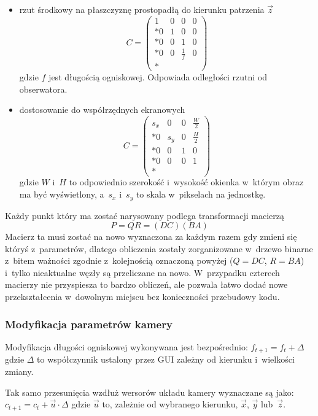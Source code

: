 \documentclass[12pt,a4paper]{article}
\begin{document}
\begin{itemize}
  \item rzut środkowy na płaszczyznę prostopadłą do kierunku patrzenia $\overset{\rightarrow}{z}$
      \[ C = \left( \begin{array}{cccc}
        1 & 0 & 0 & 0 \\*
        0 & 1 & 0 & 0 \\*
        0 & 0 & 1 & 0 \\*
        0 & 0 & \frac{1}{f} & 0 \\*
      \end{array} \right)
      \]
      gdzie $f$ jest długością ogniskowej. Odpowiada odległości rzutni od obserwatora.

  \item dostosowanie do współrzędnych ekranowych
    \[ C = \left( \begin{array}{cccc}
      s_x & 0 & 0 & \frac{W}{2} \\*
      0 & s_y & 0 & \frac{H}{2} \\*
      0 & 0 & 1 & 0 \\*
      0 & 0 & 0 & 1 \\*
    \end{array} \right) \]
    gdzie $W$ i~$H$ to odpowiednio szerokość i~wysokość okienka w~którym obraz ma być wyświetlony,
    a~$s_x$ i~$s_y$ to skala w~pikselach na jednostkę.
\end{itemize}

Każdy punkt który ma zostać narysowany podlega transformacji macierzą
\[ P = QR = (DC)(BA) \]
Macierz ta musi zostać na nowo wyznaczona za każdym razem gdy zmieni się któryś z~parametrów,
dlatego obliczenia zostały zorganizowane w~drzewo binarne z~bitem ważności
zgodnie z~kolejnością oznaczoną powyżej ($Q=DC$, $R=BA$) i~tylko nieaktualne węzły
są przeliczane na nowo.
W~przypadku czterech macierzy nie przyspiesza to bardzo obliczeń,
ale pozwala łatwo dodać nowe przekształcenia w~dowolnym miejscu bez konieczności
przebudowy kodu.

\subsubsection{Modyfikacja parametrów kamery}

Modyfikacja długości ogniskowej wykonywana jest bezpośrednio:
\mbox{$f_{t+1} = f_t + \Delta$} gdzie $\Delta$ to współczynnik ustalony przez GUI
zależny od kierunku i~wielkości zmiany.

Tak samo przesunięcia wzdłuż wersorów układu kamery wyznaczane są jako:
$c_{t+1} = c_t + \overset{\rightarrow}{u}\cdot\Delta $
gdzie $\overset{\rightarrow}{u}$ to, zależnie od wybranego kierunku,
$\overset{\rightarrow}{x}$, $\overset{\rightarrow}{y}$ lub~$\overset{\rightarrow}{z}$.
\end{document}
